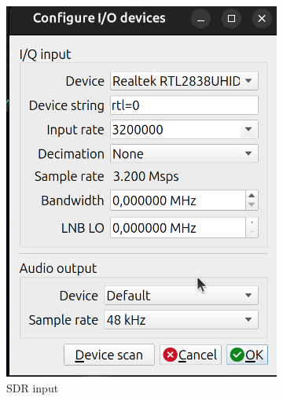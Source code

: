 \begin{figure}[h]
\centering
\begin{subfigure}{0.35\textwidth}
  \centering
  \includegraphics[width=\textwidth]{images/gqrx2.png}
  \caption{SDR input}
  \label{term331}
\end{subfigure}
\hspace{0.5cm} %
\begin{subfigure}{0.35\textwidth}
  \centering

\end{subfigure}
\end{figure}
